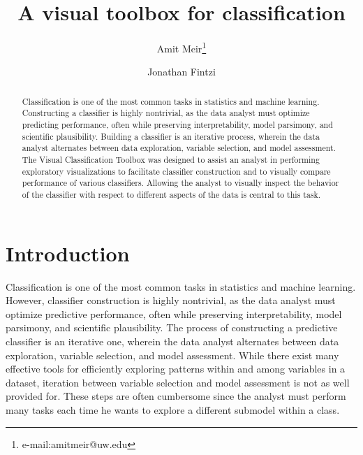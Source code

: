 \documentclass[tog]{acmsiggraph}
\title{A visual toolbox for classification}
\author{Amit Meir\thanks{e-mail:amitmeir@uw.edu}\\}
\author{Jonathan Fintzi}
\begin{document}

\maketitle

\begin{abstract}

Classification is one of the most common tasks in statistics and machine learning. Constructing a classifier is highly nontrivial, as the data analyst must optimize predicting performance, often while preserving interpretability, model parsimony, and scientific plausibility. Building a classifier is an iterative process, wherein the data analyst alternates between data exploration, variable selection, and model assessment. The Visual Classification Toolbox was designed to assist an analyst in performing exploratory visualizations to facilitate classifier construction and to visually compare performance of various classifiers. Allowing the analyst to visually inspect the behavior of the classifier with respect to different aspects of the data is central to this task.
\end{abstract}

\keywordlist


\section{Introduction}
Classification is one of the most common tasks in statistics and machine learning. However, classifier construction is highly nontrivial, as the data analyst must optimize predictive performance, often while preserving interpretability, model parsimony, and scientific plausibility. The process of constructing a predictive classifier is an iterative one, wherein the data analyst alternates between data exploration, variable selection, and model assessment. While there exist many effective tools for efficiently exploring patterns within and among variables in a dataset, iteration between variable selection and model assessment is not as well provided for. These steps are often cumbersome since the analyst must perform many tasks each time he wants to explore a different submodel within a class. 
\end{document}
